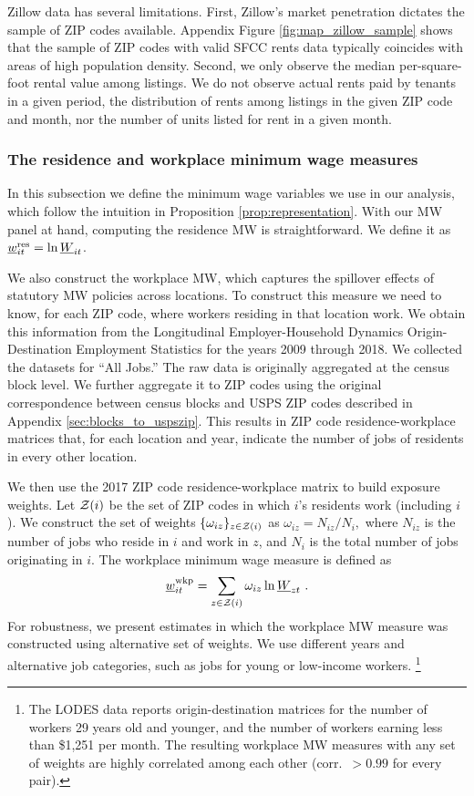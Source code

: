 Zillow data has several limitations.
First, Zillow's market penetration dictates the sample of ZIP codes available.
Appendix Figure \ref{fig:map_zillow_sample} shows that the sample of ZIP codes
with valid SFCC rents data typically coincides with areas of high population 
density.
Second, we only observe the median per-square-foot rental value among listings.
We do not observe actual rents paid by tenants in a given period, 
the distribution of rents among listings in the given ZIP code and month, nor
the number of units listed for rent in a given month.

\subsubsection{The residence and workplace minimum wage measures}
\label{sec:data_mw_measures}

In this subsection we define the minimum wage variables we use in our analysis,
which follow the intuition in Proposition \ref{prop:representation}.
With our MW panel at hand, computing the residence MW is straightforward.
We define it as $\underline{w}^{\text{res}}_{it} = \ln \underline{W}_{it}$.

We also construct the workplace MW, which captures the spillover effects of
statutory MW policies across locations.
To construct this measure we need to know, for each ZIP code, where workers 
residing in that location work.
We obtain this information from the Longitudinal Employer-Household 
Dynamics Origin-Destination Employment Statistics \parencite[LODES;][]{CensusLODES}
for the years 2009 through 2018.
We collected the datasets for ``All Jobs.''
The raw data is originally aggregated at the census block level. 
We further aggregate it to ZIP codes using the original correspondence between 
census blocks and USPS ZIP codes described in Appendix 
\ref{sec:blocks_to_uspszip}.
This results in ZIP code residence-workplace matrices that, for each location 
and year, indicate the number of jobs of residents in every other location.

We then use the 2017 ZIP code residence-workplace matrix to build exposure 
weights.
Let $\mathcal{Z}(i)$ be the set of ZIP codes in which $i$'s residents work 
(including $i$).
We construct the set of weights $\{\omega_{iz}\}_{z\in\mathcal{Z}(i)}$ as 
$ \omega_{iz} = N_{iz}/{N_i} , $
where 
$N_{iz}$ is the number of jobs who reside in $i$ and work in $z$, 
and $N_i$ is the total number of jobs originating in $i$.
The workplace minimum wage measure is defined as
\begin{equation*}\label{eq:mw_wkp_definition}
    \mw^{\wkp}_{it} = \sum_{z\in\Z(i)} \omega_{iz} \ln \MW_{zt} \ .
\end{equation*}
For robustness, we present estimates in which the workplace MW measure
was constructed using alternative set of weights.
We use different years and alternative job categories,
such as jobs for young or low-income workers.%
\footnote{The LODES data reports origin-destination matrices for the 
number of workers 29 years old and younger, and the number of workers 
earning less than \$1,251 per month.
The resulting workplace MW measures with any set of weights are highly correlated 
among each other (corr.\ $>0.99$ for every pair).}

